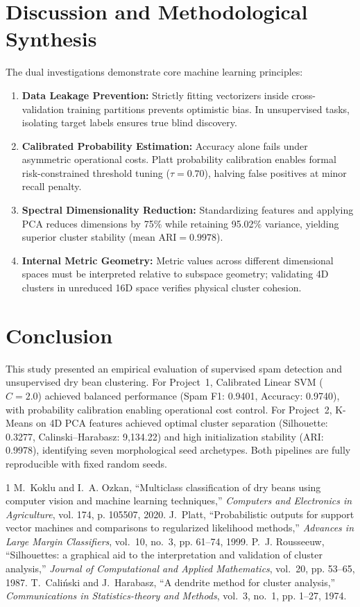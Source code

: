 \documentclass[10pt,onecolumn,letterpaper]{article}
\begin{document}
\section{Discussion and Methodological Synthesis}
The dual investigations demonstrate core machine learning principles:
\begin{enumerate}
  \item \textbf{Data Leakage Prevention:} Strictly fitting vectorizers inside cross-validation training partitions prevents optimistic bias. In unsupervised tasks, isolating target labels ensures true blind discovery.
  \item \textbf{Calibrated Probability Estimation:} Accuracy alone fails under asymmetric operational costs. Platt probability calibration enables formal risk-constrained threshold tuning ($\tau=0.70$), halving false positives at minor recall penalty.
  \item \textbf{Spectral Dimensionality Reduction:} Standardizing features and applying PCA reduces dimensions by 75\% while retaining 95.02\% variance, yielding superior cluster stability ($\text{mean ARI}=0.9978$).
  \item \textbf{Internal Metric Geometry:} Metric values across different dimensional spaces must be interpreted relative to subspace geometry; validating 4D clusters in unreduced 16D space verifies physical cluster cohesion.
\end{enumerate}

\section{Conclusion}
This study presented an empirical evaluation of supervised spam detection and unsupervised dry bean clustering. For Project~1, Calibrated Linear SVM ($C=2.0$) achieved balanced performance (Spam F1: 0.9401, Accuracy: 0.9740), with probability calibration enabling operational cost control. For Project~2, K-Means on 4D PCA features achieved optimal cluster separation (Silhouette: 0.3277, Calinski--Harabasz: 9,134.22) and high initialization stability (ARI: 0.9978), identifying seven morphological seed archetypes. Both pipelines are fully reproducible with fixed random seeds.


\begin{thebibliography}{1}
M.~Koklu and I.~A. Ozkan, ``Multiclass classification of dry beans using computer vision and machine learning techniques,'' \emph{Computers and Electronics in Agriculture}, vol. 174, p. 105507, 2020.
J.~Platt, ``Probabilistic outputs for support vector machines and comparisons to regularized likelihood methods,'' \emph{Advances in Large Margin Classifiers}, vol.~10, no.~3, pp. 61--74, 1999.
P.~J. Rousseeuw, ``Silhouettes: a graphical aid to the interpretation and validation of cluster analysis,'' \emph{Journal of Computational and Applied Mathematics}, vol.~20, pp. 53--65, 1987.
T.~Cali{\'n}ski and J.~Harabasz, ``A dendrite method for cluster analysis,'' \emph{Communications in Statistics-theory and Methods}, vol.~3, no.~1, pp. 1--27, 1974.
\end{thebibliography}
\end{document}
